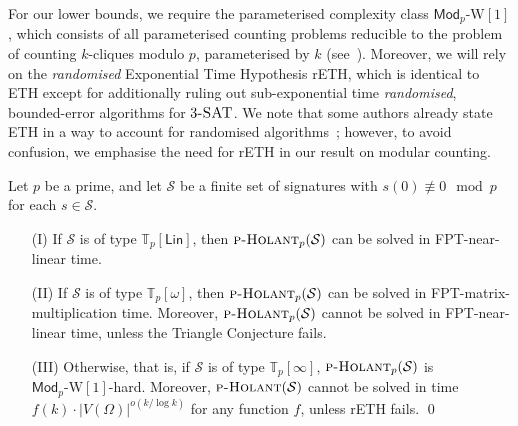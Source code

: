 \documentclass[authorcolumns,numberwithinsect]{no-lipics-v2022}
\newcommand{\W}{\mathrm{W}}
\newcommand{\holantprob}{\text{\sc{p-Holant}}}
\begin{document}
For our lower bounds, we require the parameterised complexity class $\mathsf{Mod}_p\text{-}\W[1]$, which consists of all parameterised counting problems reducible to the problem of counting $k$-cliques modulo $p$, parameterised by $k$ (see~\cite{CurticapeanDH21}). Moreover, we will rely on the \emph{randomised} Exponential Time Hypothesis rETH, which is identical to ETH except for additionally ruling out sub-exponential time \emph{randomised}, bounded-error algorithms for $3\textsc{-SAT}$. We note that some authors already state ETH in a way to account for randomised algorithms~\cite{CurticapeanDH21}; however, to avoid confusion, we emphasise the need for rETH in our result on modular counting. 

\begin{theorem}\label{thm:modular_classification}
     Let $p$ be a prime, and let $\mathcal{S}$ be a finite set of signatures with $s(0)\not\equiv 0 \mod p$ for each $s\in \mathcal{S}$.
    \begin{itemize}
        \item[(I)] If $\mathcal{S}$ is of type $\mathbb{T}_p[\mathsf{Lin}]$, then $\holantprob_p(\mathcal{S})$ can be solved in FPT-near-linear time.
        \item[(II)] If $\mathcal{S}$ is of type $\mathbb{T}_p[\omega]$, then $\holantprob_p(\mathcal{S})$ can be solved in FPT-matrix-multiplication time. Moreover, $\holantprob_p(\mathcal{S})$ cannot be solved in FPT-near-linear time, unless the Triangle Conjecture fails.
        \item[(III)] Otherwise, that is, if $\mathcal{S}$ is of type $\mathbb{T}_p[\infty]$, $\holantprob_p(\mathcal{S})$ is $\mathsf{Mod}_p\text{-}\W[1]$-hard. Moreover, $\holantprob(\mathcal{S})$ cannot be solved in time $f(k)\cdot |V(\Omega)|^{o(k/\log k)}$ for any function $f$, unless rETH fails.  \qed
    \end{itemize}
\end{theorem}
\end{document}
